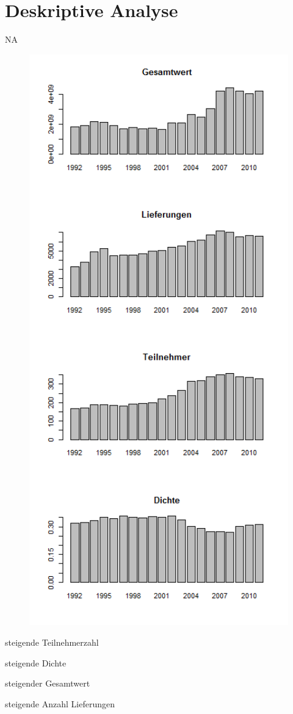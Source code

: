\documentclass{article}
\begin{document}


\section{Deskriptive Analyse}

NA

\begin{figure}
\centering
\includegraphics[width = 1.00\textwidth]{Grafiken/Deskriptiv.png}
\end{figure}

\begin{alignment}
\item steigende Teilnehmerzahl
\item steigende Dichte
\item steigender Gesamtwert
\item steigende Anzahl Lieferungen
\end{alignment}
\end{document}
